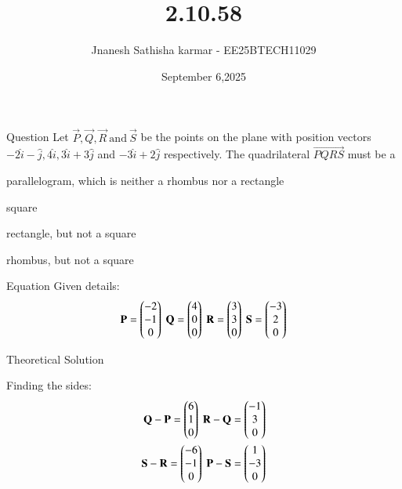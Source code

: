 \documentclass{beamer}
\title %
{2.10.58}
\date{September 6,2025}
\author 
{Jnanesh Sathisha karmar - EE25BTECH11029}
\begin{document}
\frame{\titlepage}
\begin{frame}{Question}
 Let $\vec{P},\vec{Q},\vec{R}\  \text{and}\  \vec{S}$ be the points on the plane with position vectors $-2\hat{i} -\hat{j}, 4\hat{i}, 3\hat{i} + 3\hat{j}$
and $-3\hat{i} + 2\hat{j}$ respectively. The quadrilateral $\vec{PQRS}$ must be a
\begin{enumerate}
\begin{multicols}{1}
    \item parallelogram, which is neither a rhombus nor a rectangle
    \item square
    \item rectangle, but not a square
    \item rhombus, but not a square
\end{multicols}
\end{enumerate}
\end{frame}



\begin{frame}{Equation}
Given details:
\begin{align}
    \vec{P}=\myvec{-2\\-1\\0}\ \vec{Q}=\myvec{4\\0\\0}\ 
    \vec{R}=\myvec{3\\3\\0}\ 
    \vec{S}=\myvec{-3\\2\\0}
\end{align}
\end{frame}
\begin{frame}{Theoretical Solution}

Finding the sides:
\begin{align}
\vec{Q}-\vec{P}=\myvec{6\\1\\0} \  \vec{R}-\vec{Q}=\myvec{-1\\3\\0} \\
\vec{S}-\vec{R}=\myvec{-6\\-1\\0} \ 
\vec{P}-\vec{S}=\myvec{1\\-3\\0}
\end{align}
\end{frame}
\end{document}
